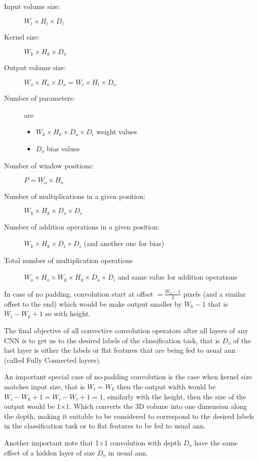\begin{description}
\item [Input volume size:] \(W_i\times H_i\times D_i \)
\item [Kernel size:] \( W_k\times H_k\times D_o \)
\item [Output volume size:] \( W_o\times H_o\times D_o = W_i\times H_i\times D_o \)
\item [Number of parameters:] are
\begin{itemize}
\item \( W_k\times H_k\times D_o\times D_i \) weight values
\item \( D_o \) bias values
\end{itemize}
\item [Number of window positions:] \( P = W_o\times H_o \)
\item [Number of multiplications in a given position:] \( W_k\times H_k\times D_o\times D_i \)
\item [Number of addition operations in a given position:] \( W_k\times H_k\times D_i\times D_i\) (and another one for bias)
\item [Total number of multiplication operations] \( W_o\times H_o\times W_k\times H_k\times D_o\times D_i\) and same value for addition operations
\end{description}

In case of no padding, convolution start at offset \( =\frac{W_k-1}{2} \) pixels (and a similar offset to the end)
which would be make output smaller by \(W_k-1\) that is \(W_{i}-W_{k}+1\) so with height.

The final objective of all convective convolution operators after all layers of any CNN is
to get us to the desired labels of the classification task, that is \(D_o\)
of the last layer is either the labels or flat features that are being fed to usual \gls{ann} (called Fully Connected layers).

An important special case of no-padding convolution is the case when kernel size matches input size,
that is \(W_i=W_k\) then the output width would be \(W_{i}-W_{k}+1=W_i-W_i+1=1\),
similarly with the height, then the size of the output would be 1×1.
Which converts the 3D volume into one dimension along the depth,
making it suitable to be considered to correspond to the desired labels in the classification task or
to flat features to be fed to usual \gls{ann}.

Another important note that 1×1 convolution with depth \(D_o\)
have the same effect of a hidden layer of size \(D_o\) in usual \gls{ann}.

